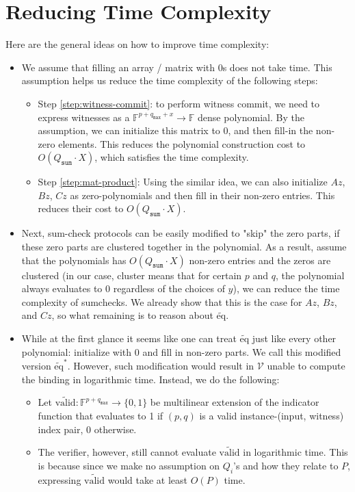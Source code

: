 \documentclass{article}
\newcommand{\Qsum}{Q_{\mathtt{sum}}}
\newcommand{\qmax}{q_{\mathtt{max}}}
\newcommand{\V}{\mathcal{V}}
\newcommand{\F}{\mathbb{F}}
\newcommand{\eq}{\widetilde{\mbox{eq}}}
\newcommand{\valid}{\tilde{\mbox{valid}}}
\begin{document}
\section{Reducing Time Complexity}\label{reduce-time}
Here are the general ideas on how to improve time complexity:
\begin{itemize}
    \item We assume that filling an array / matrix with 0s does not take time. This assumption helps us reduce the time complexity of the following steps:
    \begin{itemize}
        \item Step \ref{step:witness-commit}: to perform witness commit, we need to express witnesses as a $\F^{p + \qmax + x}\to\F$ dense polynomial. By the assumption, we can initialize this matrix to 0, and then fill-in the non-zero elements. This reduces the polynomial construction cost to $O(\Qsum \cdot X)$, which satisfies the time complexity.
        \item Step \ref{step:mat-product}: Using the similar idea, we can also initialize $Az$, $Bz$, $Cz$ as zero-polynomials and then fill in their non-zero entries. This reduces their cost to $O(\Qsum \cdot X)$.
    \end{itemize}
    \item Next, sum-check protocols can be easily modified to "skip" the zero parts, if these zero parts are clustered together in the polynomial. As a result, assume that the polynomials has $O(\Qsum \cdot X)$ non-zero entries and the zeros are clustered (in our case, cluster means that for certain $p$ and $q$, the polynomial always evaluates to 0 regardless of the choices of $y$), we can reduce the time complexity of sumchecks. We already show that this is the case for $Az$, $Bz$, and $Cz$, so what remaining is to reason about $\eq$.
    \item While at the first glance it seems like one can treat $\eq$ just like every other polynomial: initialize with 0 and fill in non-zero parts. We call this modified version $\eq^*$. However, such modification would result in $\V$ unable to compute the binding in logarithmic time. Instead, we do the following:
    \begin{itemize}
        \item Let $\valid:\F^{p + \qmax}\to \{0, 1\}$ be multilinear extension of the indicator function that evaluates to 1 if $(p, q)$ is a valid instance-(input, witness) index pair, 0 otherwise.
        \item The verifier, however, still cannot evaluate $\valid$ in logarithmic time. This is because since we make no assumption on $Q_i$'s and how they relate to $P$, expressing $\valid$ would take at least $O(P)$ time.

\end{itemize}
\end{itemize}
\end{document}
